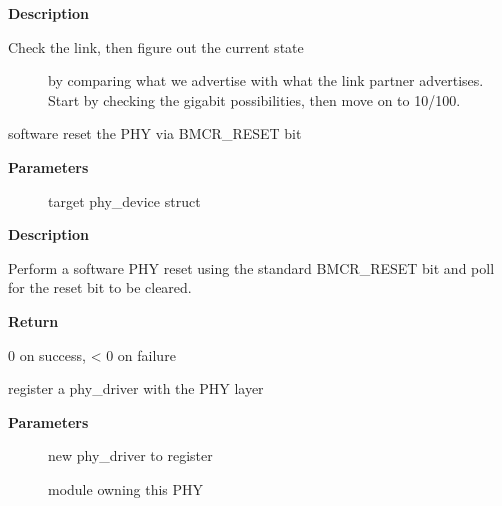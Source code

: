 \documentclass[a4paper,8pt,english]{sphinxmanual}
\begin{document}
\textbf{Description}
\begin{description}
\item[{Check the link, then figure out the current state}] \leavevmode
by comparing what we advertise with what the link partner
advertises.  Start by checking the gigabit possibilities,
then move on to 10/100.

\end{description}

\begin{fulllineitems}
\label{networking/kapi:c.genphy_soft_reset}
software reset the PHY via BMCR\_RESET bit

\end{fulllineitems}


\textbf{Parameters}
\begin{description}
\item[{}] \leavevmode
target phy\_device struct

\end{description}

\textbf{Description}

Perform a software PHY reset using the standard
BMCR\_RESET bit and poll for the reset bit to be cleared.

\textbf{Return}

0 on success, \textless{} 0 on failure

\begin{fulllineitems}
\label{networking/kapi:c.phy_driver_register}
register a phy\_driver with the PHY layer

\end{fulllineitems}


\textbf{Parameters}
\begin{description}
\item[{}] \leavevmode
new phy\_driver to register

\item[{}] \leavevmode
module owning this PHY

\end{description}
\end{document}
